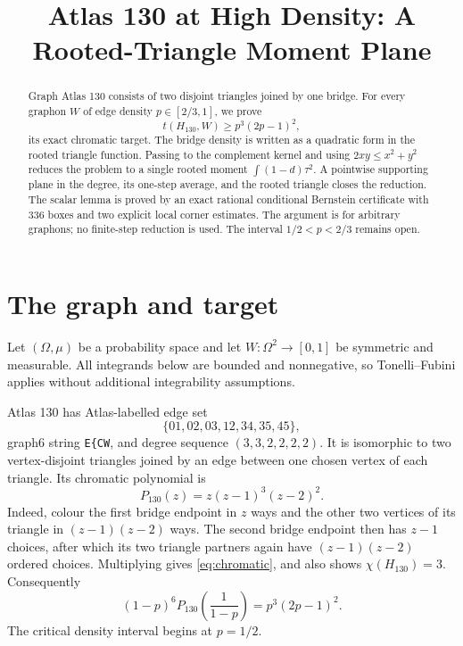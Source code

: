 \documentclass[11pt]{article}
\title{Atlas 130 at High Density: A Rooted-Triangle Moment Plane}
\author{}
\date{}
\begin{document}
\maketitle

\begin{abstract}
Graph Atlas 130 consists of two disjoint triangles joined by one bridge.
For every graphon $W$ of edge density $p\in[2/3,1]$, we prove
\[
 t(H_{130},W)\geq p^3(2p-1)^2,
\]
its exact chromatic target.  The bridge density is written as a quadratic
form in the rooted triangle function.  Passing to the complement kernel and
using $2xy\leq x^2+y^2$ reduces the problem to a single rooted moment
$\int(1-d)\tau^2$.  A pointwise supporting plane in the degree, its one-step
average, and the rooted triangle closes the reduction.  The scalar lemma is
proved by an exact rational conditional Bernstein certificate with 336
boxes and two explicit local corner estimates.  The argument is for
arbitrary graphons; no finite-step reduction is used.  The interval
$1/2<p<2/3$ remains open.
\end{abstract}

\section{The graph and target}

Let $(\Omega,\mu)$ be a probability space and let
$W\colon\Omega^2\to[0,1]$ be symmetric and measurable.  All integrands below
are bounded and nonnegative, so Tonelli--Fubini applies without additional
integrability assumptions.

Atlas 130 has Atlas-labelled edge set
\[
 \{01,02,03,12,34,35,45\},
\]
graph6 string \verb|E{CW|, and degree sequence $(3,3,2,2,2,2)$.
It is isomorphic to two vertex-disjoint triangles joined by an edge between
one chosen vertex of each triangle.  Its chromatic polynomial is
\begin{equation}
 P_{130}(z)=z(z-1)^3(z-2)^2.
 \label{eq:chromatic}
\end{equation}
Indeed, colour the first bridge endpoint in $z$ ways and the other two
vertices of its triangle in $(z-1)(z-2)$ ways.  The second bridge endpoint
then has $z-1$ choices, after which its two triangle partners again have
$(z-1)(z-2)$ ordered choices.  Multiplying gives \eqref{eq:chromatic}, and
also shows $\chi(H_{130})=3$.
Consequently
\begin{equation}
 (1-p)^6P_{130}\!\left(\frac1{1-p}\right)
 =p^3(2p-1)^2.
 \label{eq:target}
\end{equation}
The critical density interval begins at $p=1/2$.
\end{document}

